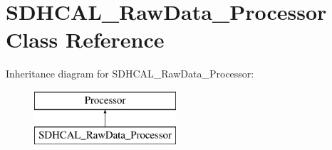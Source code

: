 \section{S\-D\-H\-C\-A\-L\-\_\-\-Raw\-Data\-\_\-\-Processor Class Reference}
\label{classSDHCAL__RawData__Processor}
Inheritance diagram for S\-D\-H\-C\-A\-L\-\_\-\-Raw\-Data\-\_\-\-Processor\-:\begin{figure}[H]
\begin{center}
\leavevmode
\includegraphics[height=2.000000cm]{classSDHCAL__RawData__Processor}
\end{center}
\end{figure}
